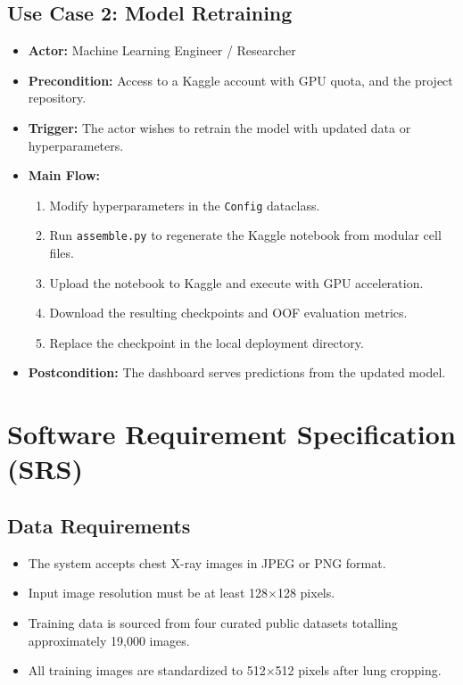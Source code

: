 \documentclass[12pt]{report}
\begin{document}
\subsection{Use Case 2: Model Retraining}
\begin{itemize}
    \item \textbf{Actor:} Machine Learning Engineer / Researcher
    \item \textbf{Precondition:} Access to a Kaggle account with GPU quota, and the project repository.
    \item \textbf{Trigger:} The actor wishes to retrain the model with updated data or hyperparameters.
    \item \textbf{Main Flow:}
    \begin{enumerate}
        \item Modify hyperparameters in the \texttt{Config} dataclass.
        \item Run \texttt{assemble.py} to regenerate the Kaggle notebook from modular cell files.
        \item Upload the notebook to Kaggle and execute with GPU acceleration.
        \item Download the resulting checkpoints and OOF evaluation metrics.
        \item Replace the checkpoint in the local deployment directory.
    \end{enumerate}
    \item \textbf{Postcondition:} The dashboard serves predictions from the updated model.
\end{itemize}

\section{Software Requirement Specification (SRS)}

\subsection{Data Requirements}
\begin{itemize}
    \item The system accepts chest X-ray images in JPEG or PNG format.
    \item Input image resolution must be at least 128$\times$128 pixels.
    \item Training data is sourced from four curated public datasets totalling approximately 19,000 images.
    \item All training images are standardized to 512$\times$512 pixels after lung cropping.
\end{itemize}
\end{document}
